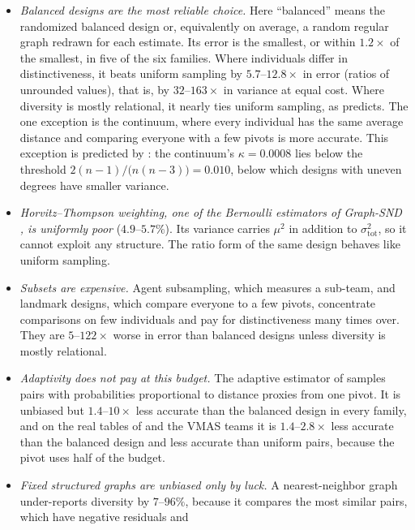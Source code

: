 \documentclass[twoside,11pt]{article}
\newcommand{\sigmatot}{\sigma^2_{\mathrm{tot}}}
\begin{document}
\begin{itemize}
  \item \emph{Balanced designs are the most reliable choice.} Here ``balanced'' means the randomized
  balanced design or, equivalently on average, a random regular graph
  redrawn for each estimate. Its error is the smallest, or within $1.2\times$ of
  the smallest, in five of the six families. Where individuals differ in
  distinctiveness, it beats uniform sampling by $5.7$--$12.8\times$ in error
  (ratios of unrounded values),
  that is, by $32$--$163\times$ in variance at equal cost. Where diversity is mostly relational, it nearly ties uniform
  sampling, as  predicts. The one exception is the
  continuum, where every individual has the same average distance and
  comparing everyone with a few pivots is more accurate. This exception is
  predicted by : the continuum's $\kappa=0.0008$
  lies below the threshold ${2(n-1)/\bigl(n(n-3)\bigr)}=0.010$, below which designs with
  uneven degrees have smaller variance.
  \item \emph{Horvitz--Thompson weighting, one of the Bernoulli estimators
  of Graph-SND \textup{\citep{ray2026graphsnd}}, is uniformly poor} ($4.9$--$5.7\%$).
  Its variance carries $\mu^2$ in addition to $\sigmatot$, so it cannot
  exploit any structure. The ratio form of the same design behaves like uniform
  sampling.
  \item \emph{Subsets are expensive.} Agent subsampling, which measures a
  sub-team, and landmark designs, which compare everyone to a few pivots,
  concentrate comparisons on few individuals and pay for distinctiveness
  many times over. They are $5$--$122\times$ worse in error than balanced designs
  unless diversity is mostly relational.
  \item \emph{Adaptivity does not pay at this budget.} The adaptive estimator
  of \citet{chechik2015average} samples pairs with probabilities proportional
  to distance proxies from one pivot. It is unbiased but $1.4$--$10\times$
  less accurate than the balanced design in every family, and on the real
  tables of  and the VMAS teams it is
  $1.4$--$2.8\times$ less accurate than the balanced design and less
  accurate than uniform pairs, because the pivot uses half of the budget.
  \item \emph{Fixed structured graphs are unbiased only by luck.} A
  nearest-neighbor graph under-reports diversity by $7$--$96\%$, because
  it compares the most similar pairs, which have negative residuals and

\end{itemize}
\end{document}
